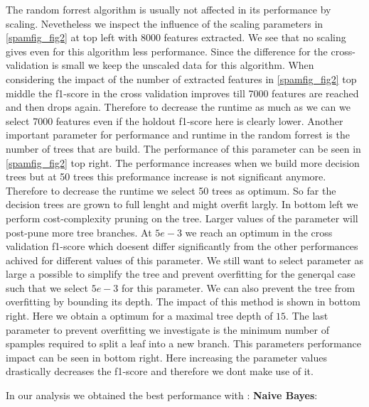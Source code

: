 \documentclass[11pt]{article}
\begin{document}
%
The random forrest algorithm is usually not affected in its performance by scaling. Nevetheless we inspect the influence of the scaling parameters in \ref{spamfig_fig2} at top left with 8000 features extracted. We see that no scaling gives even for this algorithm less performance. Since the difference for the cross-validation is small we keep the unscaled data for this algorithm. When considering the impact of the number of extracted features in \ref{spamfig_fig2} top middle the f1-score in the cross validation improves till 7000 features are reached and then drops again. Therefore to decrease the runtime as much as we can we select 7000 features even if the holdout f1-score here is clearly lower. Another important parameter for performance and runtime in the random forrest is the number of trees that are build. The performance of this parameter can be seen in \ref{spamfig_fig2} top right. The performance increases when we build more decision trees but at 50 trees this preformance increase is not significant anymore. Therefore to decrease the runtime we select 50 trees as optimum. So far the decision trees are grown to full lenght and might overfit largly. In \label{spamfig_fig2} bottom left we perform cost-complexity pruning on the tree. Larger values of the parameter will post-pune more tree branches. At $5e-3$ we reach an optimum in the cross validation f1-score which doesent differ significantly from the other performances achived for different values of this parameter. We still want to select parameter as large a possible to simplify the tree and prevent overfitting for the generqal case such that we select $5e-3$ for this parameter. We can also prevent the tree from overfitting by bounding its depth. The impact of this method is shown in \label{spamfig_fig2} bottom right. Here we obtain a optimum for a maximal tree depth of $15$. The last parameter to prevent overfitting we investigate is the minimum number of spamples required to split a leaf into a new branch. This parameters performance impact can be seen in \label{spamfig_fig2} bottom right. Here increasing the parameter values drastically decreases the f1-score and therefore we dont make use of it.

In our analysis we obtained the best performance with :
\textbf{Naive Bayes}:
\end{document}
